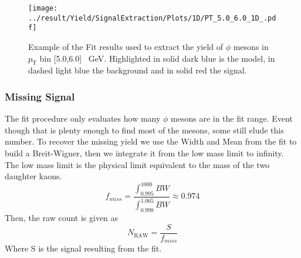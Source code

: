 \begin{figure}
\centering
\texttt{[image: ../result/Yield/SignalExtraction/Plots/1D/PT\_5.0\_6.0\_1D\_.pdf]}
\caption{Example of the Fit results used to extract the yield of $\phi$ mesons in $p_{\text{T}}$ bin [5.0,6.0] \SI{}{\giga\electronvolt}. Highlighted in solid dark blue is the model, in dashed light blue the background and in solid red the signal.}
\label{fig:1Dfit}
\end{figure}

\subsubsection{Missing Signal}
The fit procedure only evaluates how many $\phi$ mesons are in the fit range. Event though that is plenty enough to find most of the mesons, some still elude this number. To recover the missing yield we use the Width and Mean from the fit to build a Breit-Wigner, then we integrate it from the low mass limit to infinity. The low mass limit is the physical limit equivalent to the mass of the two daughter kaons.
\begin{equation}
f_{miss} = \frac{\int_{0.995}^{1000}BW}{\int_{0.998}^{1.065}BW} \approx 0.974
\end{equation}
Then, the raw count is given as
\begin{equation}
N_{\text{RAW}} = \frac{S}{f_{miss}}
\end{equation}
Where S is the signal resulting from the fit.


